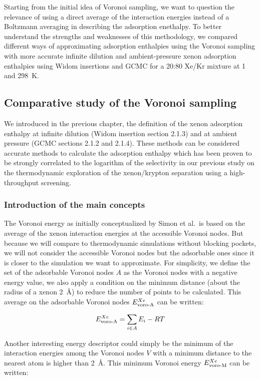 \documentclass[main]{subfiles}
\begin{document}
Starting from the initial idea of Voronoi sampling, we want to question the relevance of using a direct average of the interaction energies instead of a Boltzmann averaging in describing the adsorption enethalpy. To better understand the strengths and weaknesses of this methodology, we compared different ways of approximating adsorption enthalpies using the Voronoi sampling with more accurate infinite dilution and ambient-pressure xenon adsorption enthalpies using Widom insertions and GCMC for a 20:80 Xe/Kr mixture at \SI{1}{\atm} and \SI{298}{\kelvin}.

\subsection{Comparative study of the Voronoi sampling}

We introduced in the previous chapter, the definition of the xenon adsorption enthalpy at infinite dilution (Widom insertion section 2.1.3) and at ambient pressure (GCMC sections 2.1.2 and 2.1.4). These methods can be considered accurate methods to calculate the adsorption enthalpy which has been proven to be strongly correlated to the logarithm of the selectivity in our previous study on the thermodynamic exploration of the xenon/krypton separation using a high-throughput screening.

\subsubsection{Introduction of the main concepts}

The Voronoi energy as initially conceptualized by Simon et al.\ is based on the average of the xenon interaction energies at the accessible Voronoi nodes. But because we will compare to thermodynamic simulations without blocking pockets, we will not consider the accessible Voronoi nodes but the adsorbable ones since it is closer to the simulation we want to approximate. For simplicity, we define the set of the adsorbable Voronoi nodes $A$ as the Voronoi nodes with a negative energy value, we also apply a condition on the minimum distance (about the radius of a xenon \SI{2}{\angstrom}) to reduce the number of points to be calculated. This average on the adsorbable Voronoi nodes $E_{\text{voro-A}}^{Xe}$ can be written:

\begin{equation}
    E_{\text{voro-A}}^{Xe} = \sum_{i \in A} E_i -RT
\end{equation}

Another interesting energy descriptor could simply be the minimum of the interaction energies among the Voronoi nodes $V$ with a minimum distance to the nearest atom is higher than \SI{2}{\angstrom}. This minimum Voronoi energy $E_{\text{voro-M}}^{Xe}$ can be written: 
\end{document}
